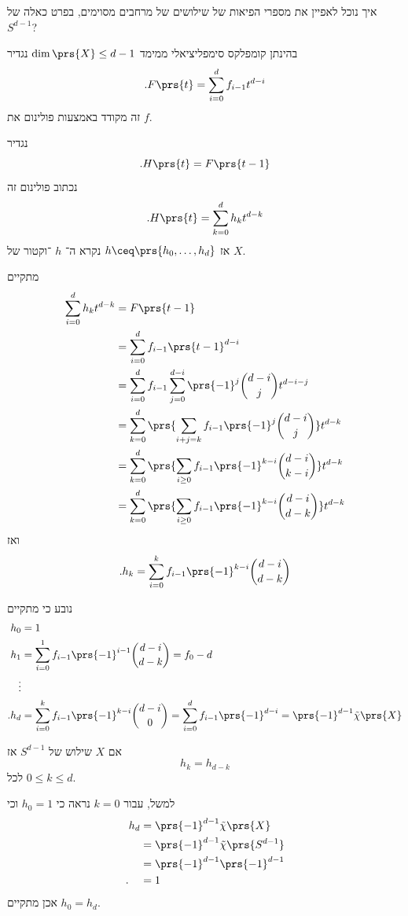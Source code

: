\documentclass[a4paper,10pt,twoside,openany]{book}
\begin{document}
\begin{question}
איך נוכל לאפיין את מספרי הפיאות של שילושים של מרחבים מסוימים, בפרט כאלה של
$S^{d-1}$?
\end{question}

\begin{definition}
בהינתן קומפלקס סימפליציאלי ממימד
$\dim\prs{X} \leq d-1$
נגדיר
\[\text{.} F\prs{t} = \sum_{i=0}^d f_{i-1} t^{d-i}\]
זה מקודד באמצעות פולינום את
$f$.

נגדיר
\[\text{.} H\prs{t} = F\prs{t-1}\]
נכתוב פולינום זה
\[\text{.} H\prs{t} = \sum_{k=0}^d h_k t^{d-k}\]
אז
$h \ceq \prs{h_0, \ldots, h_d}$
נקרא ה־%
$h$%
־וקטור של
$X$.
\end{definition}

\begin{remark}
מתקיים
\begin{align*}
\sum_{i=0}^d h_k t^{d-k} &= F\prs{t-1}
\\&= \sum_{i = 0}^d f_{i-1} \prs{t-1}^{d-i}
\\&=
\sum_{i=0}^d f_{i-1} \sum_{j = 0}^{d-i} \prs{-1}^j \binom{d-i}{j} t^{d-i-j}
\\&=
\sum_{k=0}^d \prs{\sum_{i+j = k} f_{i-1} \prs{-1}^j \binom{d-i}{j}} t^{d-k}
\\&=
\sum_{k=0}^d \prs{\sum_{i \geq 0} f_{i-1} \prs{-1}^{k-i} \binom{d-i}{k-i}} t^{d-k}
\\&=
\sum_{k=0}^d \prs{\sum_{i \geq 0} f_{i-1} \prs{-1}^{k-i} \binom{d-i}{d-k}} t^{d-k}
\end{align*}
ואז
\[\text{.} h_k = \sum_{i=0}^k f_{i-1} \prs{-1}^{k-i} \binom{d-i}{d-k}\]

נובע כי מתקיים
\begin{align*}
h_0 &= 1 \\
h_1 &= \sum_{i=0}^1 f_{i-1} \prs{-1}^{i-1} \binom{d-i}{d-k} = f_0 - d \\
\vdots \\
\text{.} h_d &= \sum_{i = 0}^k f_{i-1} \prs{-1}^{k-i} \binom{d-i}{0} = \sum_{i=0}^d f_{i-1}\prs{-1}^{d-i} = \prs{-1}^{d-1} \tilde{\chi}\prs{X}
\end{align*}
\end{remark}

\begin{proposition}
אם
$X$
שילוש של
$S^{d-1}$
אז
\[h_k = h_{d-k}\]
לכל
$0 \leq k \leq d$.
\end{proposition}

\begin{remark}
למשל, עבור
$k=0$
נראה כי
$h_0 = 1$
וכי
\begin{align*}
h_d &= \prs{-1}^{d-1} \tilde{\chi}\prs{X}
\\&= \prs{-1}^{d-1} \tilde{\chi}\prs{S^{d-1}}
\\&= \prs{-1}^{d-1} \prs{-1}^{d-1}
\\ \text{.} \hphantom{h_d} &= 1
\end{align*}
אכן מתקיים
$h_0 = h_d$.
\end{remark}
\end{document}
